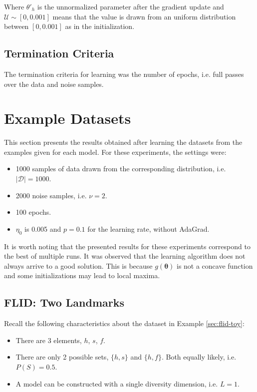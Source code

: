 Where $\theta'_{h}$ is the unnormalized parameter after the gradient update and $\mathcal{U} \sim [0, 0.001]$ means that the value is drawn from an uniform distribution between $[0, 0.001]$ as in the initialization.

\subsection{Termination Criteria}

The termination criteria for learning was the number of epochs, i.e. full passes over the data and noise samples.

\section{Example Datasets}

This section presents the results obtained after learning the datasets from the examples given for each model. For these experiments, the settings were:

\begin{itemize}
  \item 1000 samples of data drawn from the corresponding distribution, i.e. $|\mathcal{D}| = 1000$.
  \item 2000 noise samples, i.e. $\nu = 2$.
  \item 100 epochs.
  \item $\eta_{0}$ is 0.005 and $p = 0.1$ for the learning rate, without AdaGrad.
\end{itemize}

It is worth noting that the presented results for these experiments correspond to the best of multiple runs. It was observed that the learning algorithm does not always arrive to a good solution. This is because $g(\boldsymbol{\theta})$ is not a concave function and some initializations may lead to local maxima.

\subsection{FLID: Two Landmarks}

Recall the following characteristics about the dataset in Example \ref{sec:flid-toy}:

\begin{itemize}
  \item There are 3 elements, $h$, $s$, $f$.
  \item There are only 2 possible sets, $\{h,s\}$ and $\{h,f\}$. Both equally likely, i.e. $P(S) = 0.5$.
  \item A model can be constructed with a single diversity dimension, i.e. $L=1$.
\end{itemize}

